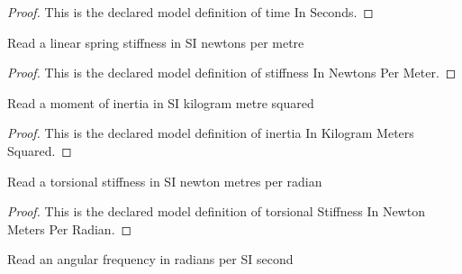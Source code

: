 \begin{proof}
  This is the declared model definition of time In Seconds.
\end{proof}
\begin{definition}
  \label{def:physics:phyx-mini-0267:phyxminiproblems-problemphyxmini0267-stiffnessinnewtonspermeter}
  Read a linear spring stiffness in SI newtons per metre
\end{definition}
\begin{proof}
  This is the declared model definition of stiffness In Newtons Per Meter.
\end{proof}
\begin{definition}
  \label{def:physics:phyx-mini-0267:phyxminiproblems-problemphyxmini0267-inertiainkilogrammeterssquared}
  Read a moment of inertia in SI kilogram metre squared
\end{definition}
\begin{proof}
  This is the declared model definition of inertia In Kilogram Meters Squared.
\end{proof}
\begin{definition}
  \label{def:physics:phyx-mini-0267:phyxminiproblems-problemphyxmini0267-torsionalstiffnessinnewtonmetersperradian}
  Read a torsional stiffness in SI newton metres per radian
\end{definition}
\begin{proof}
  This is the declared model definition of torsional Stiffness In Newton Meters Per Radian.
\end{proof}
\begin{definition}
  \label{def:physics:phyx-mini-0267:phyxminiproblems-problemphyxmini0267-angularfrequencyinradianspersecond}
  Read an angular frequency in radians per SI second
\end{definition}
